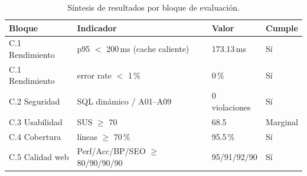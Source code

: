 \begin{table}[H]
\centering
\caption{Síntesis de resultados por bloque de evaluación.}
\label{tab:sintesis}
\begin{tabular}{@{}llll@{}}
\toprule
Bloque & Indicador & Valor & Cumple \\
\midrule
C.1 Rendimiento & p95 $<$ 200\,ms (cache caliente) & 173.13\,ms & Sí \\
C.1 Rendimiento & error rate $<$ 1\,\% & 0\,\% & Sí \\
C.2 Seguridad & SQL dinámico / A01--A09 & 0 violaciones & Sí \\
C.3 Usabilidad & SUS $\ge$ 70 & 68.5 & Marginal \\
C.4 Cobertura & líneas $\ge$ 70\,\% & 95.5\,\% & Sí \\
C.5 Calidad web & Perf/Acc/BP/SEO $\ge$ 80/90/90/90 & 95/91/92/90 & Sí \\
\bottomrule
\end{tabular}
\end{table}